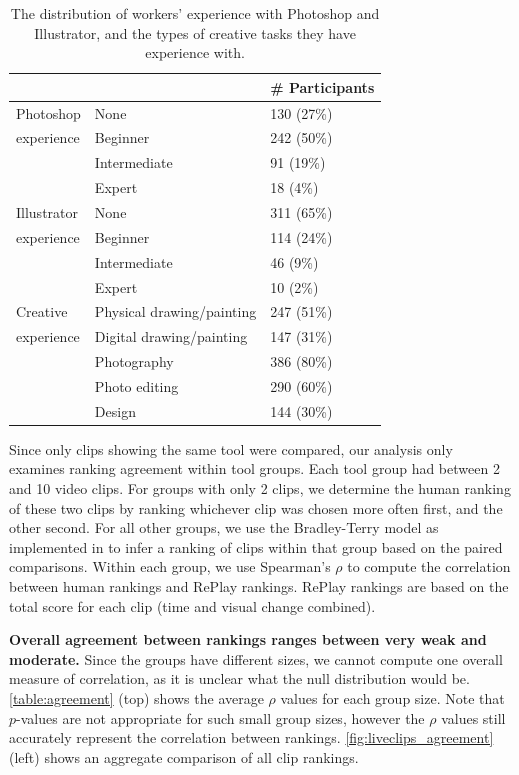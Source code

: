 \begin{table}[b!]
\small
\centering
\begin{tabular}{lll}
            &                           & \# Participants \\ \hline
Photoshop   & None                      & 130 (27\%)       \\
experience  & Beginner                  & 242 (50\%)      \\
            & Intermediate              & 91 (19\%)       \\
            & Expert                    & 18 (4\%)        \\ \hline
Illustrator & None                      & 311 (65\%)      \\
experience  & Beginner                  & 114 (24\%)      \\
            & Intermediate              & 46 (9\%)       \\
            & Expert                    & 10 (2\%)        \\ \hline
Creative    & Physical drawing/painting & 247 (51\%)      \\
experience  & Digital drawing/painting  & 147 (31\%)      \\
            & Photography               & 386 (80\%)      \\
            & Photo editing             & 290 (60\%)      \\
            & Design                    & 144 (30\%)     
\end{tabular}
\caption{The distribution of workers' experience with Photoshop and Illustrator, and the types of creative tasks they have experience with.}
\label{table:experience}
\end{table}

Since only clips showing the same tool were compared, our analysis only examines ranking agreement within tool groups. Each tool group had between 2 and 10 video clips. For groups with only 2 clips, we determine the human ranking of these two clips by ranking whichever clip was chosen more often first, and the other second. For all other groups, we use the Bradley-Terry model as implemented in \cite{Maystre2015} to infer a ranking of clips within that group based on the paired comparisons. Within each group, we use Spearman's $\rho$ to compute the correlation between human rankings and RePlay rankings. RePlay rankings are based on the total score for each clip (time and visual change combined).

\textbf{Overall agreement between rankings ranges between very weak and moderate.} Since the groups have different sizes, we cannot compute one overall measure of correlation, as it is unclear what the null distribution would be. \autoref{table:agreement} (top) shows the average $\rho$ values for each group size. Note that $p$-values are not appropriate for such small group sizes, however the $\rho$ values still accurately represent the correlation between rankings. \autoref{fig:liveclips_agreement} (left) shows an aggregate comparison of all clip rankings. 

